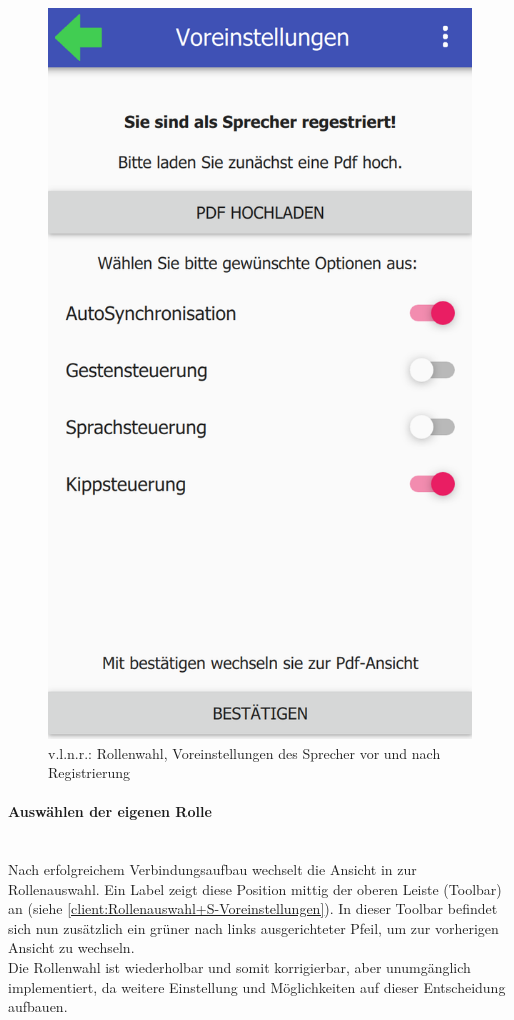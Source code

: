 \begin{figure}[ht!]
\begin{minipage}{0.31\linewidth}
		\includegraphics[scale=0.5]{GUI/Bilder/3-S-5-Voreinstellung.PNG}
	\end{minipage}
	\caption{v.l.n.r.: Rollenwahl, Voreinstellungen des Sprecher vor und nach Registrierung{\tiny}}
	\label{client:Rollenauswahl+S-Voreinstellungen}
\end{figure}

\newpage

\paragraph{Auswählen der eigenen Rolle}$\;$\\
Nach erfolgreichem Verbindungsaufbau wechselt die Ansicht in zur Rollenauswahl. Ein Label zeigt diese Position mittig der oberen Leiste (Toolbar) an (siehe \autoref{client:Rollenauswahl+S-Voreinstellungen}).
In dieser Toolbar befindet sich nun zusätzlich ein grüner nach links ausgerichteter Pfeil, um zur vorherigen Ansicht zu wechseln.
\\Die Rollenwahl ist wiederholbar und somit korrigierbar, aber unumgänglich implementiert, da weitere Einstellung und Möglichkeiten auf dieser Entscheidung aufbauen.
